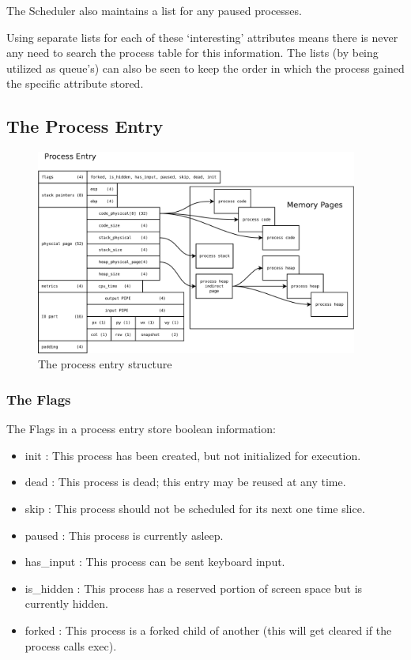 \documentclass[a4paper]{report}
\begin{document}
The Scheduler also maintains a list for any paused processes.

Using separate lists for each of these `interesting' attributes means there is never any need to search the process table for this information. The lists (by being utilized as queue's) can also be seen to keep the order in which the process gained the specific attribute stored.


\clearpage
\subsection{The Process Entry}

\begin{figure}[ht]
\centering
\includegraphics[width=400px]{images/Process_Entry_Structure}
\caption{The process entry structure}
\label{fig:WinTitleBarScreen}
\end{figure}

\subsubsection{The Flags}

The Flags in a process entry store boolean information:
\begin{itemize}
\item init : This process has been created, but not initialized for execution.
\item dead : This process is dead; this entry may be reused at any time.
\item skip : This process should not be scheduled for its next one time slice.
\item paused : This process is currently asleep.
\item has\_input : This process can be sent keyboard input.
\item is\_hidden : This process has a reserved portion of screen space but is currently hidden.
\item forked : This process is a forked child of another (this will get cleared if the process calls exec).
\end{itemize}
\end{document}
